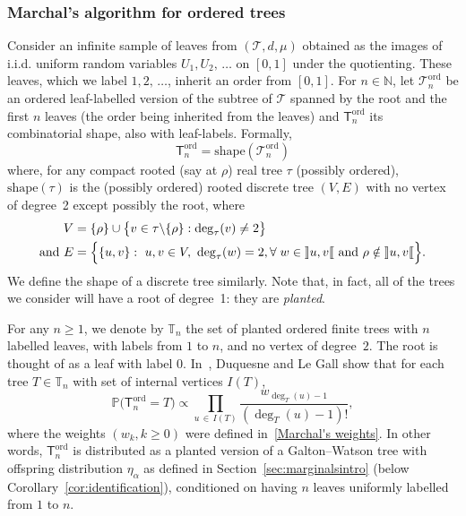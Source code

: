 \documentclass[10pt]{amsart}
\theoremstyle{definition}\newtheorem{defi}[theo]{Definition}\newtheorem{rema}[theo]{Remark}\newtheorem{exam}[theo]{Example}\newtheorem{exem}[theo]{Example}\newtheorem{nota}[theo]{Notation}
\newcommand{\llbracketl}{\mathopen{]\mkern -2.7mu]}}
\newcommand{\rrbracketl}{\mathclose{[\mkern -2.7mu[}}
\newcommand{\ord}{\mathrm{ord}}
\newcommand{\shape}{\mathrm{shape}}
\newcommand{\cT}{\mathcal{T}}
\newcommand{\sT}{\mathsf{T}}
\newcommand{\A}{\mathbb{T}}
\newcommand{\N}{\mathbb{N}}
\newcommand{\bbP}{\mathbb{P}}
\let\oldforall\forall
\renewcommand*{\forall}{\mathrel{\oldforall}}
\begin{document}
\subsubsection{Marchal's algorithm for ordered trees}\label{sec:MarchalTree}

Consider an infinite sample of leaves from $(\cT,d,\mu)$ obtained as the images of i.i.d. uniform random variables $U_1, U_2,\,\ldots$ on $[0,1]$ under the quotienting. These leaves, which we label $1, 2, \,\ldots$, inherit an order from $[0,1]$. For $n \in \N$, let $\cT^{\ord}_n$ be an ordered leaf-labelled version of the subtree of $\cT$ spanned by the root and the first $n$ leaves (the order being inherited from the leaves) and $\sT^{\ord}_n$ its combinatorial shape, also with leaf-labels. Formally,
\[
\sT^{\ord}_n=\shape\left(\cT^{\ord}_n\right)
\]
where, for any compact rooted (say at $\rho$) real tree $\tau$ (possibly ordered), $\shape(\tau)$ is the (possibly ordered) rooted discrete tree $(V,E)$ with no vertex of degree~2 except possibly the root, where
\begin{equation}\label{def:shape}
\begin{split}
V &= \{\rho\} \cup \big\{v \in \tau\backslash \{\rho\}:\deg_{\tau}(v) \neq 2\big\} \\
\text{and} \ E &= \Big\{\{u,v\}:\ u,v\in V,\ \deg_{\tau}(w)=2, \forall w \in\llbracketl u,v\rrbracketl\text{ and } \rho \notin\llbracketl u,v\rrbracketl\Big\}.
\end{split}
\end{equation}
We define the shape of a discrete tree similarly. Note that, in fact, all of the trees we consider will have a root of degree~1: they are \emph{planted}.


For any $n\geq 1$, we denote by $\A_n$ the set of planted ordered finite trees with $n$ labelled leaves, with labels from $1$ to $n$, and no vertex of degree~$2$. The root is thought of as a leaf with label $0$. In~\cite[Section~3]{DuquesneLeGall}, Duquesne and Le Gall show that for each tree $T\in\A_n$ with set of internal vertices $I(T)$,
\begin{equation}\label{plane tree distribution}
\bbP\big(\sT^{\ord}_n=T\big)\propto \prod_{u\,\in\, I(T)}\frac{w_{\deg_T(u)-1}}{\left(\deg_T(u)-1\right)!},
\end{equation}
where the weights $(w_k,k\geq 0)$ were defined in~\eqref{Marchal's weights}. In other words, $\sT^{\ord}_n$ is distributed as a planted version of a Galton--Watson tree with offspring distribution $\eta_{\alpha}$ as defined in Section~\ref{sec:marginalsintro} (below Corollary~\ref{cor:identification}), conditioned on having $n$ leaves uniformly labelled from $1$ to $n$.
\end{document}
